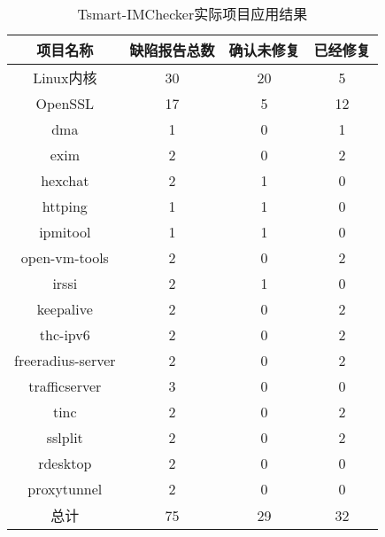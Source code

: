 \begin{table}[b]
	\centering
	\begin{minipage}[t]{0.7\linewidth} %
		\caption{Tsmart-IMChecker实际项目应用结果}
		\label{tab:4-4-result}
		\begin{tabular}{cccc}
			\hline
			项目名称 & 缺陷报告总数 & 确认未修复 & 已经修复 \\
			\hline
			Linux内核 & 30 & 20 & 5 \\
			 OpenSSL & 17 & 5 & 12\\
			  dma  & 1 & 0 & 1\\
			   exim   &2  & 0 & 2\\
			    hexchat    & 2 & 1 & 0\\
			   httping & 1 & 1 & 0\\
			   ipmitool  & 1 & 1 & 0\\
			    open-vm-tools   &2  & 0 & 2\\
			     irssi    & 2 & 1 & 0\\
			 keepalive & 2 & 0 & 2\\
			 thc-ipv6 & 2 & 0 & 2\\
			 freeradius-server & 2 & 0 & 2\\
			 trafficserver & 3 & 0 & 0\\  
			  tinc  & 2 & 0 & 2\\
			   sslplit   & 2 & 0 & 2\\
			   rdesktop     & 2 & 0 & 0\\
			      proxytunnel    & 2 & 0 & 0\\
			      总计 & 75 & 29 & 32 \\
			\hline
		\end{tabular}
	\end{minipage}
\end{table}